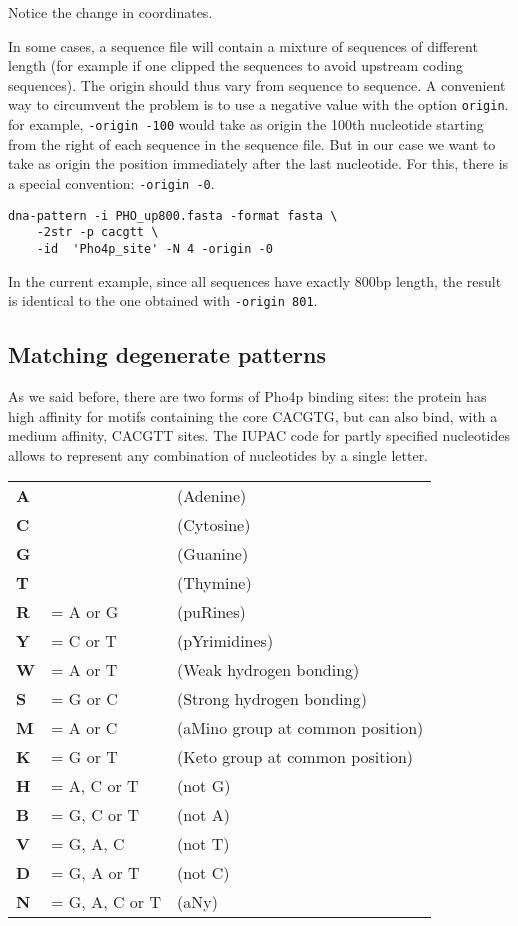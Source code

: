 Notice the change in coordinates.

In some cases, a sequence file will contain a mixture of sequences of
different length (for example if one clipped the sequences to avoid
upstream coding sequences). The origin should thus vary from sequence
to sequence. A convenient way to circumvent the problem is to use a
negative value with the option \texttt{origin}. for example,
\texttt{-origin -100} would take as origin the 100th nucleotide
starting from the right of each sequence in the sequence file. But in
our case we want to take as origin the position immediately after the
last nucleotide. For this, there is a special convention: \texttt{-origin
-0}.

\begin{verbatim}
dna-pattern -i PHO_up800.fasta -format fasta \
    -2str -p cacgtt \
    -id  'Pho4p_site' -N 4 -origin -0
\end{verbatim}

In the current example, since all sequences have exactly 800bp length,
the result is identical to the one obtained with \texttt{-origin 801}.

\subsection{Matching degenerate patterns}

As we said before, there are two forms of Pho4p binding sites: the
protein has high affinity for motifs containing the core CACGTG, but
can also bind, with a medium affinity, CACGTT sites. The IUPAC code
for partly specified nucleotides allows to represent any combination
of nucleotides by a single letter.

\begin{tabular}{lll}
\textbf{A} &  & (Adenine) \\
\textbf{C} &  & (Cytosine) \\
\textbf{G} &  & (Guanine) \\
\textbf{T} &  & (Thymine) \\
\textbf{R} & = A or G & (puRines) \\
\textbf{Y} & = C or T & (pYrimidines) \\
\textbf{W} & = A or T & (Weak hydrogen bonding) \\
\textbf{S} & = G or C & (Strong hydrogen bonding) \\
\textbf{M} & = A or C & (aMino group at common position) \\
\textbf{K} & = G or T & (Keto group at common position) \\
\textbf{H} & = A, C or T & (not G) \\
\textbf{B} & = G, C or T & (not A) \\
\textbf{V} & = G, A, C & (not T) \\
\textbf{D} & = G, A or T & (not C) \\
\textbf{N} & = G, A, C or T & (aNy) \\
\end{tabular}

